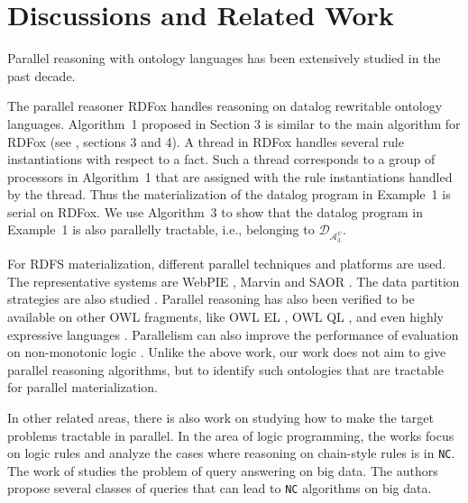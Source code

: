 \documentclass{article}
\begin{document}
\section{Discussions and Related Work}

Parallel reasoning with ontology languages has been extensively studied in the past decade.

The parallel reasoner RDFox \cite{DBLP:conf/aaai/MotikNPHO14} handles reasoning on datalog rewritable ontology languages.
Algorithm~1 proposed in Section 3 is similar to the main algorithm for RDFox (see \cite{DBLP:conf/aaai/MotikNPHO14}, sections 3 and 4). A thread in RDFox handles several rule instantiations with respect to a fact. Such a thread corresponds to a group of processors in Algorithm~1 that are assigned with the rule instantiations handled by the thread. Thus the materialization of the datalog program in Example~1 is serial on RDFox. We use Algorithm~3 to show that the datalog program in Example~1 is also parallelly tractable, i.e., belonging to $\mathcal{D}_{\mathcal{A}_3^{\psi}}$.

For RDFS materialization, different parallel techniques and platforms are used. The representative systems are WebPIE \cite{DBLP:journals/ws/UrbaniKMHB12}, Marvin \cite{oren2009marvin} and SAOR \cite{DBLP:journals/ijswis/HoganHP09}.
The data partition strategies are also studied \cite{DBLP:conf/ISCApdcs/SomaP08,DBLP:conf/semweb/WeaverH09}. Parallel reasoning has also been verified to be available on other OWL fragments, like OWL EL \cite{DBLP:journals/jar/KazakovKS14}, OWL QL \cite{DBLP:conf/dlog/LemboSS13}, and even highly expressive languages \cite{DBLP:conf/otm/LiebigM07,DBLP:conf/dlog/SchlichtS08,DBLP:conf/dlog/WuH12}. Parallelism can also improve the performance of evaluation on non-monotonic logic \cite{Tachmazidis-Stratified-ECAI2012}.
Unlike the above work, our work does not aim to give parallel reasoning algorithms, but to identify such ontologies
that are tractable for parallel materialization.

In other related areas, there is also work on studying how to make the target problems tractable in parallel. In the area of logic programming, the works \cite{DBLP:journals/algorithmica/UllmanG88,DBLP:journals/jacm/AfratiP93} focus on logic rules and analyze the cases where reasoning on chain-style rules is in \texttt{NC}. The work of \cite{DBLP:journals/jcst/FanH14} studies the problem of query answering on big data. The authors propose several classes of queries that can lead to \texttt{NC} algorithms on big data.
\end{document}
